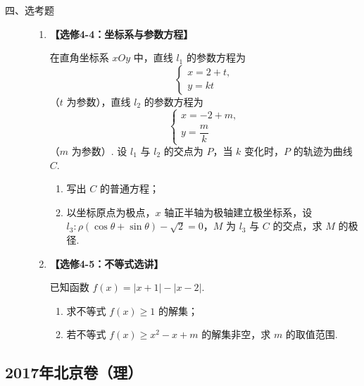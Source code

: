 \begin{description}

    \item[四、选考题]

    \begin{enumerate}[leftmargin=5pt]

      \addtocounter{enumi}{+21}

        \item \textbf{【选修4-4：坐标系与参数方程】}

在直角坐标系 \(xOy\) 中，直线 \(l_1\) 的参数方程为
\[
\begin{cases}

x=2+t,\\
y=kt

\end{cases}
\]（\(t\) 为参数），直线 \(l_2\) 的参数方程为
\[
\begin{cases}

x=-2+m,\\
y=\dfrac{m}{k}

\end{cases}
\]（\(m\) 为参数）. 设 \(l_1\) 与 \(l_2\) 的交点为 \(P\)，当 \(k\) 变化时，\(P\) 的轨迹为曲线 \(C\).

\begin{enumerate}
\item 写出 \(C\) 的普通方程；
\item 以坐标原点为极点，\(x\) 轴正半轴为极轴建立极坐标系，设 \(l_3:\rho(\cos\theta+\sin\theta)-\sqrt2=0\)，\(M\) 为 \(l_3\) 与 \(C\) 的交点，求 \(M\) 的极径.
\end{enumerate}

        \item \textbf{【选修4-5：不等式选讲】}

已知函数 \(f(x)=|x+1|-|x-2|\).

\begin{enumerate}
\item 求不等式 \(f(x)\ge 1\) 的解集；
\item 若不等式 \(f(x)\ge x^2-x+m\) 的解集非空，求 \(m\) 的取值范围.
\end{enumerate}

    \end{enumerate}

\end{description}


\subsection{2017年北京卷（理）}\label{gk:2017年北京卷（理）}

